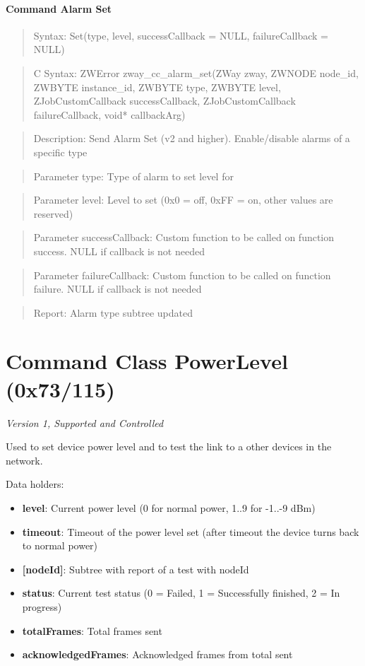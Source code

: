 \paragraph{Command Alarm Set}
\begin{quote}Syntax: Set(type, level, successCallback = NULL, failureCallback = NULL)\end{quote}
\begin{quote}C Syntax: ZWError zway\_cc\_alarm\_set(ZWay zway, ZWNODE node\_id, ZWBYTE instance\_id, ZWBYTE type, ZWBYTE level, ZJobCustomCallback successCallback, ZJobCustomCallback failureCallback, void* callbackArg)\end{quote}
\begin{quote}Description: Send Alarm Set (v2 and higher). Enable/disable alarms of a specific type\end{quote}
\begin{quote}Parameter type: Type of alarm to set level for\end{quote}
\begin{quote}Parameter level: Level to set (0x0 = off, 0xFF = on, other values are reserved)\end{quote}
\begin{quote}Parameter successCallback: Custom function to be called on function success. NULL if callback is not needed\end{quote}
\begin{quote}Parameter failureCallback: Custom function to be called on function failure. NULL if callback is not needed\end{quote}
\begin{quote}Report: Alarm type subtree updated\end{quote}


\section{Command Class PowerLevel (0x73/115)}

\textit{Version 1, Supported and Controlled}
\newline

Used to set device power level and to test the link to a other devices in the network.
\newline

\noindent
Data holders:

\begin{itemize}
\item \textbf{level}: Current power level (0 for normal power, 1..9 for -1..-9 dBm)
\item \textbf{timeout}: Timeout of the power level set (after timeout the device turns back to normal power)
\item \textbf{[nodeId]}: Subtree with report of a test with nodeId
\item \qquad\textbf{status}: Current test status (0 = Failed, 1 = Successfully finished, 2 = In progress)
\item \qquad\textbf{totalFrames}: Total frames sent
\item \qquad\textbf{acknowledgedFrames}: Acknowledged frames from total sent
\end{itemize}

